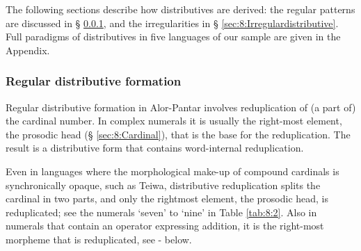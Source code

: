     

 

 

The following sections describe how distributives are derived: the regular patterns are discussed in {\S} \ref{sec:8:Regulardistributive}, and the irregularities in {\S} \ref{sec:8:Irregulardistributive}.  Full paradigms of distributives in five languages of our sample are given in the Appendix.

\subsubsection{Regular distributive formation  }
\label{sec:8:Regulardistributive}






Regular distributive formation in Alor-Pantar involves reduplication of (a part of) the cardinal number. In complex numerals it is usually the right-most element, the prosodic head ({\S} \ref{sec:8:Cardinal}), that is the base for the reduplication. The result is a distributive form that contains word-internal reduplication. 

Even in languages where the morphological make-up of compound cardinals is synchronically opaque, such as Teiwa, distributive reduplication splits the cardinal in two parts, and only the rightmost element, the prosodic head, is reduplicated; see the numerals `seven' to `nine' in Table \ref{tab:8:2}. Also in numerals that contain an operator expressing addition, it is the right-most morpheme that is reduplicated, see - below.
 
